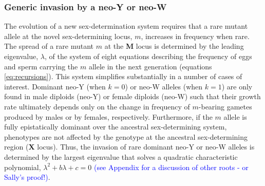 \documentclass[12pt]{article}
\begin{document}

\subsubsection*{Generic invasion by a neo-Y or neo-W}

The evolution of a new sex-determination system requires that a rare mutant allele at the novel sex-determining locus, $m$, increases in frequency when rare. 
The spread of a rare mutant $m$ at the \textbf{M} locus is determined by the leading eigenvalue, $\lambda$, of the system of eight equations describing the frequency of eggs and sperm carrying the $m$ allele in the next generation (equations \ref{eq:recursions}). %
This system simplifies substantially in a number of cases of interest. 
Dominant neo-Y (when $k=0$) or neo-W alleles (when $k=1$) are only found in male diploids (neo-Y) or female diploids (neo-W) such that their growth rate ultimately depends only on the change in frequency of $m$-bearing gametes produced by males or by females, respectively. 
Furthermore, if the $m$ allele is fully epistatically dominant over the ancestral sex-determining system, phenotypes are not affected by the genotype at the ancestral sex-determining region (\textbf{X} locus). 
Thus, the invasion of rare dominant neo-Y or neo-W alleles is determined by the largest eigenvalue that solves a quadratic characteristic polynomial,
$\lambda^2+ b \lambda + c =0$ \textcolor{blue}{(see Appendix for a discussion of other roots - or Sally's proof!)}.
%
\end{document}
